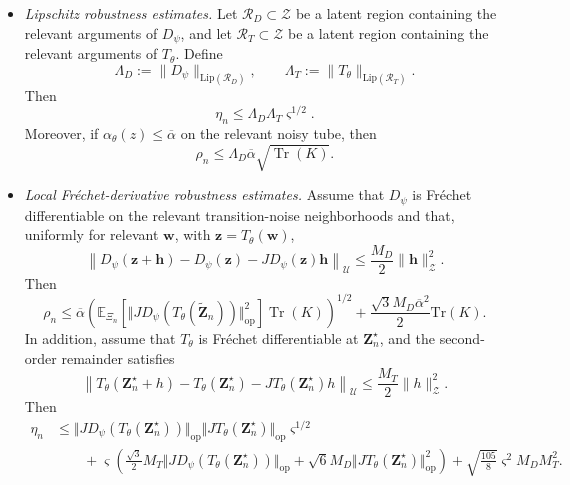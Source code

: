 \documentclass[11pt]{article}
\newcommand{\ol}{\overline}
\begin{document}
\begin{proposition}
\begin{itemize}[topsep=0pt, itemsep=0pt]
\item[(b)]\textit{Lipschitz robustness estimates.}
Let $\mathcal R_D\subset\mathcal Z$ be a latent region containing the relevant arguments of $D_\psi$, and let $\mathcal R_T\subset\mathcal Z$ be a latent region containing the relevant arguments of $T_\theta$. Define
\[
\Lambda_D := \|D_\psi\|_{\mathrm{Lip}(\mathcal R_D)},
\qquad
\Lambda_T := \|T_\theta\|_{\mathrm{Lip}(\mathcal R_T)}.
\]
Then
\[
\eta_n\le\Lambda_D\Lambda_T\varsigma^{1/2}.
\]
Moreover, if $\alpha_\theta(z)\le \ol\alpha$ on the relevant noisy tube, then
\[
\rho_n\le\Lambda_D\ol\alpha\sqrt{\operatorname{Tr}(K)}.
\]

\item[(c)]\textit{Local Fr\'echet-derivative robustness estimates.} 
Assume that $D_\psi$ is Fr\'echet differentiable on the relevant transition-noise neighborhoods and that, uniformly for relevant $\mathbf w$, with $\mathbf z=T_\theta(\mathbf w)$,
\[
\left\|D_\psi(\mathbf z+\mathbf h)-D_\psi(\mathbf z)-JD_\psi(\mathbf z)\mathbf h\right\|_{\mathcal U}\le\frac{M_D}{2}\|\mathbf h\|_{\mathcal Z}^2.
\]
Then
\[
\rho_n\le\ol\alpha\left(\mathbb  E_{\Xi_n}\left[\bigl\Vert JD_\psi(T_\theta(\widetilde{\mathbf Z}_n))\bigr\Vert_{\mathrm{op}}^2\right]\operatorname{Tr}(K)\right)^{1/2}+
\frac{\sqrt{3}M_D\ol\alpha^2}{2}\mathrm{Tr}(K).
\]
In addition, assume that $T_\theta$ is Fr\'echet differentiable at $\mathbf Z_n^\star$, and the second-order remainder satisfies
\[
\left\|T_{\theta}(\mathbf Z_n^\star+h)-T_{\theta}(\mathbf Z_n^\star)-JT_{\theta}(\mathbf Z_n^\star)h \right\|_{\mathcal U}
\le\frac{M_T}{2}\|h\|_{\mathcal Z}^2.
\]
Then
\begin{equation*}
\begin{aligned}
\eta_n&\le
\Vert JD_\psi(T_\theta(\mathbf Z_n^\star))\Vert_{\mathrm{op}}\Vert JT_\theta(\mathbf Z_n^\star)\Vert_{\mathrm{op}}\varsigma^{1/2}
\\
&\qquad +
\varsigma\left(\frac{\sqrt{3}}{2}M_T\Vert JD_\psi(T_\theta(\mathbf Z_n^\star))\Vert_{\mathrm{op}}+\sqrt{6}M_D\Vert JT_\theta(\mathbf Z_n^\star)\Vert_{\mathrm{op}}^2\right)+\sqrt{\frac{105}{8}}\varsigma^2M_DM_T^2.
\end{aligned}
\end{equation*}


\end{itemize}
\end{proposition}
\end{document}
